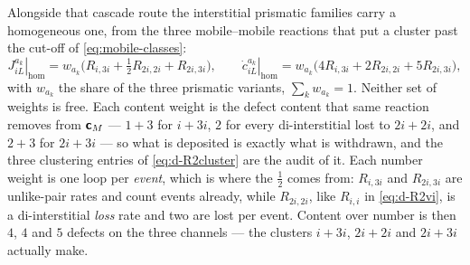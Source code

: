Alongside that cascade route the interstitial prismatic families carry a
homogeneous one, from the three mobile--mobile reactions that put a cluster past
the cut-off of \cref{eq:mobile-classes}:
\begin{equation}
  \left.J^{a_k}_{iL}\right|_{\mathrm{hom}}
    =w_{a_k}\bigl(R_{i,3i}+\tfrac12R_{2i,2i}+R_{2i,3i}\bigr),
  \qquad
  \left.\dot c^{a_k}_{iL}\right|_{\mathrm{hom}}
    =w_{a_k}\bigl(4R_{i,3i}+2R_{2i,2i}+5R_{2i,3i}\bigr),
  \label{eq:homnuc}
\end{equation}
with $w_{a_k}$ the share of the three prismatic variants, $\sum_kw_{a_k}=1$.
Neither set of weights is free. Each content weight is the defect content that
same reaction removes from $\bm{\mathsf{c}}_M$ --- $1+3$ for $i\!+\!3i$, $2$ for every
di-interstitial lost to $2i\!+\!2i$, and $2+3$ for $2i\!+\!3i$ --- so what is
deposited is exactly what is withdrawn, and the three clustering entries of
\cref{eq:d-R2cluster} are the audit of it. Each number weight is one loop per
\emph{event}, which is where the $\tfrac12$ comes from: $R_{i,3i}$ and
$R_{2i,3i}$ are unlike-pair rates and count events already, while $R_{2i,2i}$,
like $R_{i,i}$ in \cref{eq:d-R2vi}, is a di-interstitial \emph{loss} rate and
two are lost per event. Content over number is then $4$, $4$ and $5$ defects on
the three channels --- the clusters $i\!+\!3i$, $2i\!+\!2i$ and $2i\!+\!3i$
actually make.


